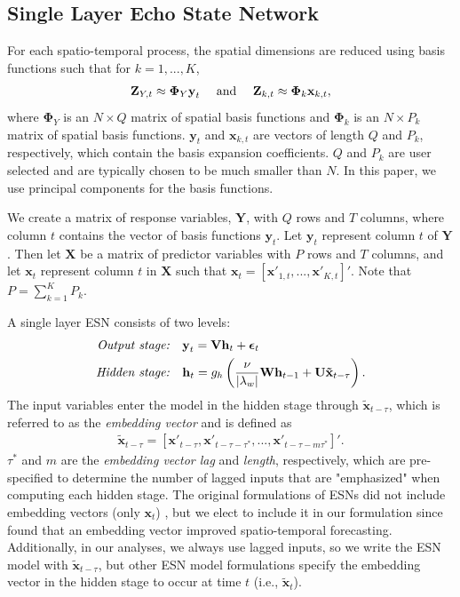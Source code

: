 \documentclass[AMS,STIX2COL]{WileyNJD-v2}
\begin{document}
\subsection{Single Layer Echo State Network} \label{sec:esn}

For each spatio-temporal process, the spatial dimensions are reduced using basis functions such that for $k=1,...,K$,
\begin{align}
    {\bf Z}_{Y,t}\approx\boldsymbol{\Phi}_Y\textbf{y}_{t} \ \ \ \mbox{ and } \ \ \
    {\bf Z}_{k,t}\approx\boldsymbol{\Phi}_k\textbf{x}_{k,t},
\end{align} 
where $\boldsymbol{\Phi}_Y$ is an $N\times Q$ matrix of spatial basis functions and $\boldsymbol{\Phi}_k$ is an $N\times P_k$ matrix of spatial basis functions. $\textbf{y}_t$ and $\textbf{x}_{k,t}$ are vectors of length $Q$ and $P_k$, respectively, which contain the basis expansion coefficients. $Q$ and $P_k$ are user selected and are typically chosen to be much smaller than $N$. In this paper, we use principal components for the basis functions.

We create a matrix of response variables, $\textbf{Y}$, with $Q$ rows and $T$ columns, where column $t$ contains the vector of basis functions $\textbf{y}_t$. Let $\textbf{y}_t$ represent column $t$ of $\textbf{Y}$. Then let $\textbf{X}$ be a matrix of predictor variables with $P$ rows and $T$ columns, and let $\textbf{x}_t$ represent column $t$ in $\textbf{X}$ such that $\textbf{x}_t=[\textbf{x}'_{1,t},...,\textbf{x}'_{K,t}]'$. Note that $P=\sum_{k=1}^{K}P_k$.

A single layer ESN consists of two levels:
\begin{align}
    \text{\emph{Output stage:}} &\quad \textbf{y}_{t} = \mathbf{V} \mathbf{h}_t + \boldsymbol{\epsilon}_{t} \label{eq:output}\\
    \text{\emph{Hidden stage:}} &\quad \mathbf{h}_t = g_h \left(\frac{\nu}{|\lambda_w|} \mathbf{W} \mathbf{h}_{t-1} + \mathbf{U} \mathbf{\tilde{x}}_{t-\tau}\right). \label{eq:hidden}
\end{align}
The input variables enter the model in the hidden stage through $\tilde{\mathbf{x}}_{t-\tau}$, which is referred to as the \emph{embedding vector} and is defined as
    \begin{align}
    \tilde{\mathbf{x}}_{t-\tau}=\left[\textbf{x}'_{t-\tau},\textbf{x}'_{t-\tau-\tau^*},...,\mathbf{x}'_{t-\tau-m\tau^*}\right]'.
\end{align} 
$\tau^*$ and $m$ are the \emph{embedding vector lag} and \emph{length}, respectively, which are pre-specified to determine the number of lagged inputs that are "emphasized" when computing each hidden stage. The original formulations of ESNs did not include embedding vectors (only $\textbf{x}_t$) \citep{jaeger2001,lukosevicius2009}, but we elect to include it in our formulation since \citet{mcdermott2019} found that an embedding vector improved spatio-temporal forecasting. Additionally, in our analyses, we always use lagged inputs, so we write the ESN model with $\tilde{\textbf{x}}_{t-\tau}$, but other ESN model formulations \citep{jaeger2001,lukosevicius2009,mcdermott2019} specify the embedding vector in the hidden stage to occur at time $t$ (i.e., $\tilde{\textbf{x}}_{t}$).
\end{document}
